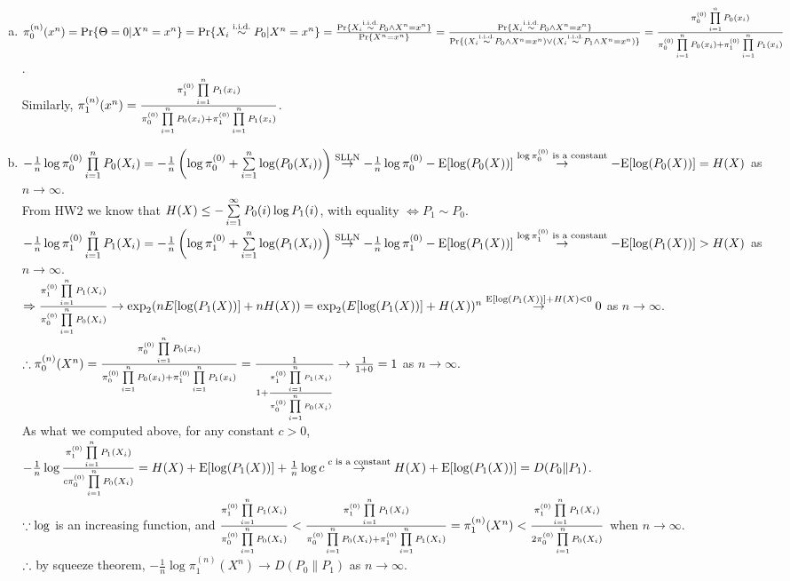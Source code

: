 \begin{pr}$ $
\begin{enumerate}[(a)]
\item $\pi_0^{(n)}(x^n)=\mathrm{Pr}\{\Theta=0|X^n=x^n\}=\mathrm{Pr}\{X_i\overset{\text{i.i.d.}}\sim P_0|X^n=x^n\}=\frac{\mathrm{Pr}\{X_i\overset{\text{i.i.d.}}\sim P_0\land X^n=x^n\}}{\mathrm{Pr}\{X^n=x^n\}}=\frac{\mathrm{Pr}\{X_i\overset{\text{i.i.d.}}\sim P_0\land X^n=x^n\}}{\mathrm{Pr}\{(X_i\overset{\text{i.i.d.}}\sim P_0\land X^n=x^n)\lor(X_i\overset{\text{i.i.d.}}\sim P_1\land X^n=x^n)\}}=\frac{\pi_0^{(0)}\prod\limits_{i=1}^nP_0(x_i)}{\pi_0^{(0)}\prod\limits_{i=1}^nP_0(x_i)+\pi_1^{(0)}\prod\limits_{i=1}^nP_1(x_i)}$.\\
Similarly, $\pi_1^{(n)}(x^n)=\frac{\pi_1^{(0)}\prod\limits_{i=1}^nP_1(x_i)}{\pi_0^{(0)}\prod\limits_{i=1}^nP_0(x_i)+\pi_1^{(0)}\prod\limits_{i=1}^nP_1(x_i)}$.
\item $-\frac1n\log\pi_0^{(0)}\prod\limits_{i=1}^nP_0(X_i)=-\frac1n\left(\log\pi_0^{(0)}+\sum\limits_{i=1}^n\log(P_0(X_i))\right)\overset{\text{SLLN}}\to-\frac1n\log\pi_0^{(0)}-\mathrm{E}[\log(P_0(X))]\overset{\log\pi_0^{(0)}\text{ is a constant}}\to-\mathrm{E}[\log(P_0(X))]=H(X)$ as $n\to\infty$.\\
From HW2 we know that $H(X)\leq-\sum\limits_{i=1}^\infty P_0(i)\log P_1(i)$, with equality $\iff P_1\sim P_0$.\\
$-\frac1n\log\pi_1^{(0)}\prod\limits_{i=1}^nP_1(X_i)=-\frac1n\left(\log\pi_1^{(0)}+\sum\limits_{i=1}^n\log(P_1(X_i))\right)\overset{\text{SLLN}}\to-\frac1n\log\pi_1^{(0)}-\mathrm{E}[\log(P_1(X))]\overset{\log\pi_1^{(0)}\text{ is a constant}}\to-\mathrm{E}[\log(P_1(X))]>H(X)$ as $n\to\infty$.\\
$\Rightarrow\frac{\pi_1^{(0)}\prod\limits_{i=1}^nP_1(X_i)}{\pi_0^{(0)}\prod\limits_{i=1}^nP_0(X_i)}\to\exp_2(nE[\log(P_1(X))]+nH(X))=\exp_2(E[\log(P_1(X))]+H(X))^n\overset{\mathrm{E}[\log(P_1(X))]+H(X)<0}\to0$ as $n\to\infty$.\\
$\therefore\pi_0^{(n)}(X^n)=\frac{\pi_0^{(0)}\prod\limits_{i=1}^nP_0(x_i)}{\pi_0^{(0)}\prod\limits_{i=1}^nP_0(x_i)+\pi_1^{(0)}\prod\limits_{i=1}^nP_1(x_i)}=\frac1{1+\frac{\pi_1^{(0)}\prod\limits_{i=1}^nP_1(X_i)}{\pi_0^{(0)}\prod\limits_{i=1}^nP_0(X_i)}}\to\frac1{1+0}=1$ as $n\to\infty$.\\
As what we computed above, for any constant $c>0$, $-\frac1n\log\frac{\pi_1^{(0)}\prod\limits_{i=1}^nP_1(X_i)}{c\pi_0^{(0)}\prod\limits_{i=1}^nP_0(X_i)}\\
=H(X)+\mathrm{E}[\log(P_1(X))]+\frac1n\log c\overset{c\text{ is a constant}}\to H(X)+\mathrm{E}[\log(P_1(X))]=D(P_0\|P_1)$.\\
$\because\log$ is an increasing function, and $\frac{\pi_1^{(0)}\prod\limits_{i=1}^nP_1(X_i)}{\pi_0^{(0)}\prod\limits_{i=1}^nP_0(X_i)}<\frac{\pi_1^{(0)}\prod\limits_{i=1}^nP_1(X_i)}{\pi_0^{(0)}\prod\limits_{i=1}^nP_0(X_i)+\pi_1^{(0)}\prod\limits_{i=1}^nP_1(X_i)}\\
=\pi_1^{(n)}(X^n)<\frac{\pi_1^{(0)}\prod\limits_{i=1}^nP_1(X_i)}{2\pi_0^{(0)}\prod\limits_{i=1}^nP_0(X_i)}$ when $n\to\infty$.\\
$\therefore$ by squeeze theorem, $-\frac1n\log\pi_1^{(n)}(X^n)\to D(P_0\|P_1)$ as $n\to\infty$.
\end{enumerate}
\end{pr}
